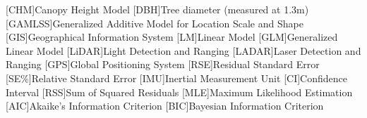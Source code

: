 
\begin{acronym}

[CHM]{Canopy Height Model}
[DBH]{Tree diameter (measured at 1.3m)}
[GAMLSS]{Generalized Additive Model for Location Scale and Shape}
[GIS]{Geographical Information System}
[LM]{Linear Model}
[GLM]{Generalized Linear Model}
[LiDAR]{Light Detection and Ranging}
[LADAR]{Laser Detection and Ranging}
[GPS]{Global Positioning System}
[RSE]{Residual Standard Error}
[SE\%]{Relative Standard Error}
[IMU]{Inertial Measurement Unit}
[CI]{Confidence Interval}
[RSS]{Sum of Squared Residuals} 
[MLE]{Maximum Likelihood Estimation} 
[AIC]{Akaike's Information Criterion} 
[BIC]{Bayesian Information Criterion} 




\end{acronym}

